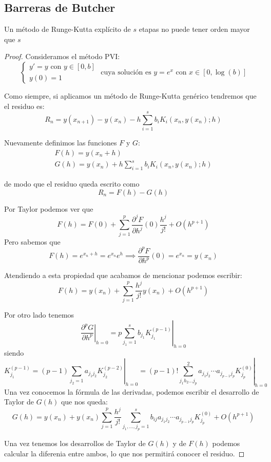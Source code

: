 \subsection{Barreras de Butcher}
\begin{theorem}
Un método de Runge-Kutta explícito de $s$ etapas no puede tener orden mayor que $s$
\end{theorem}
\begin{proof}
Consideramos el método PVI:
\[\left\{\begin{array}{l}
y'=y \text{ con } y\in [0,b]\\
y(0)=1
\end{array}\right.\text{ cuya solución es } y=e^x \text{ con } x\in [0,\log(b)]\]

Como siempre, si aplicamos un método de Runge-Kutta genérico tendremos que el residuo es:
\[R_n=y(x_{n+1})-y(x_n)-h\sum_{i=1}^sb_iK_i(x_n,y(x_n);h)\]

Nuevamente definimos las funciones $F$ y $G$:
\[\begin{array}{l}
F(h) = y(x_n+h)\\
G(h) = y(x_n)+h \sum_{i=1}^sb_iK_i(x_n,y(x_n);h)
\end{array}\]

de modo que el residuo queda escrito como
\[R_n=F(h)-G(h)\]

Por Taylor podemos ver que
\[F(h)=F(0)+\sum_{j=1}^p\frac{\partial^j F}{\partial h^j}(0)\frac{h^j}{j!} + O(h^{p+1})\]
Pero sabemos que
\[F(h)=e^{x_n+h}=e^{x_n}e^h \implies \frac{\partial^p F}{\partial h^p}(0)=e^{x_n}=y(x_n)\]

Atendiendo a esta propiedad que acabamos de mencionar podemos escribir:
\[F(h)=y(x_n)+\sum_{j=1}^p \frac{h^j}{j!}y(x_n) + O(h^{p+1})\]

Por otro lado tenemos
\[\left.\frac{\partial^p G}{\partial h^p}\right|_{h=0} = \left. p\sum_{j_1=1}^sb_{j_1}K_{j_1}^{(p-1)}\right|_{h=0}\]
siendo
\[K_{j_1}^{(p-1)}=\left.(p-1)\sum_{j_2=1}a_{j_1j_2}K_{j_2}^{(p-2)}\right|_{h=0} = \left.(p-1)!\sum_{j_1h_2...j_p}^2a_{j_1j_2}\cdots a_{j_{p-1}j_p} K_{j_p}^{(0)}\right|_{h=0}\]
Una vez conocemos la fórmula de las derivadas, podemos escribir el desarrollo de Taylor de $G(h)$ que nos queda:
\[G(h)=y(x_n)+y(x_n)\sum_{j=1}^p\frac{h^j}{j!}\sum_{j_1,...,j_p=1}^sb_{ij}a_{j_1j_2}\cdots a_{j_{p-1}j_p}K_{j_p}^{(0)} + O(h^{p+1})\]

Una vez tenemos los desarrollos de Taylor de $G(h)$ y de $F(h)$ podemos calcular la diferenia entre ambos, lo que nos permitirá conocer el residuo.


\end{proof}
